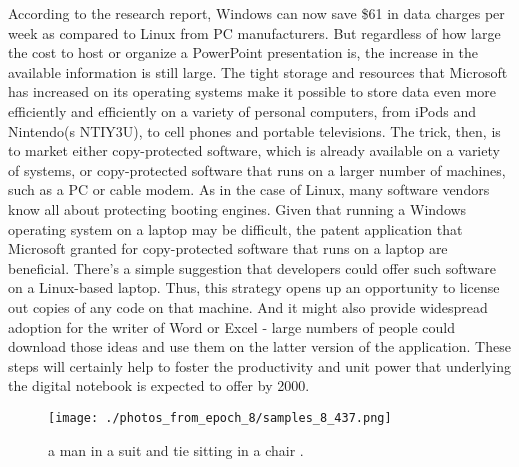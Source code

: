 \documentclass{article}%
\begin{document}
According to the research report, Windows can now save \$61 in data charges per week as compared to Linux from PC manufacturers. But regardless of how large the cost to host or organize a PowerPoint presentation is, the increase in the available information is still large.\newline%
The tight storage and resources that Microsoft has increased on its operating systems make it possible to store data even more efficiently and efficiently on a variety of personal computers, from iPods and Nintendo(s NTIY3U), to cell phones and portable televisions.\newline%
The trick, then, is to market either copy{-}protected software, which is already available on a variety of systems, or copy{-}protected software that runs on a larger number of machines, such as a PC or cable modem. As in the case of Linux, many software vendors know all about protecting booting engines.\newline%
Given that running a Windows operating system on a laptop may be difficult, the patent application that Microsoft granted for copy{-}protected software that runs on a laptop are beneficial. There's a simple suggestion that developers could offer such software on a Linux{-}based laptop.\newline%
Thus, this strategy opens up an opportunity to license out copies of any code on that machine. And it might also provide widespread adoption for the writer of Word or Excel {-} large numbers of people could download those ideas and use them on the latter version of the application. These steps will certainly help to foster the productivity and unit power that underlying the digital notebook is expected to offer by 2000.\newline%

%


\begin{figure}[h!]%
\centering%
\texttt{[image: ./photos\_from\_epoch\_8/samples\_8\_437.png]}%
\caption{a man in a suit and tie sitting in a chair .}%
\end{figure}

%
\end{document}
